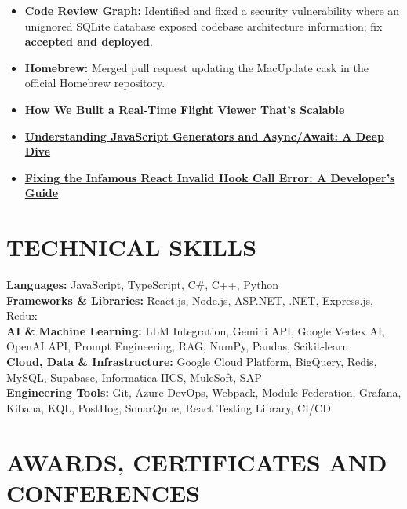 \documentclass[a4paper,10pt]{extarticle}
\begin{document}
\begin{itemize}
    \item \textbf{Code Review Graph:} Identified and fixed a security vulnerability where an
    unignored SQLite database exposed codebase architecture information; fix \textbf{accepted and
    deployed}.

    \item \textbf{Homebrew:} Merged pull request updating the MacUpdate cask in the official
    Homebrew repository.

    \item \href{https://medium.com/@shivansh01308/how-we-built-real-time-flight-viewer-thats-scalable-c5441b2ba36b}
    {\textbf{How We Built a Real-Time Flight Viewer That's Scalable}}

    \item \href{https://medium.com/@shivansh01308/understanding-javascript-generators-and-async-await-a-deep-dive-c7dc1091047f}
    {\textbf{Understanding JavaScript Generators and Async/Await: A Deep Dive}}

    \item \href{https://medium.com/@shivansh01308/fixing-the-infamous-react-invalid-hook-call-error-a-developers-guide-cde3af4dbfb8}
    {\textbf{Fixing the Infamous React Invalid Hook Call Error: A Developer's Guide}}
\end{itemize}

\section*{TECHNICAL SKILLS}

\textbf{Languages:} JavaScript, TypeScript, C\#, C++, Python\\
\textbf{Frameworks \& Libraries:} React.js, Node.js, ASP.NET, .NET, Express.js, Redux\\
\textbf{AI \& Machine Learning:} LLM Integration, Gemini API, Google Vertex AI, OpenAI API, Prompt
Engineering, RAG, NumPy, Pandas, Scikit-learn\\
\textbf{Cloud, Data \& Infrastructure:} Google Cloud Platform, BigQuery, Redis, MySQL, Supabase,
Informatica IICS, MuleSoft, SAP\\
\textbf{Engineering Tools:} Git, Azure DevOps, Webpack, Module Federation, Grafana, Kibana, KQL,
PostHog, SonarQube, React Testing Library, CI/CD

\section*{AWARDS, CERTIFICATES AND CONFERENCES}
\end{document}
